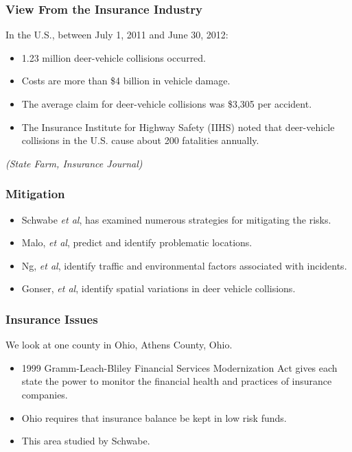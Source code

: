 \documentclass{beamer}   %
\begin{document}
\begin{frame}
  \frametitle{View From the Insurance Industry}
  In the U.S., between July 1, 2011 and June 30, 2012:
  \begin{itemize}
  \item 1.23 million deer-vehicle collisions occurred.
  \item Costs are more than \$4 billion in vehicle damage.
  \item The average claim for deer-vehicle collisions was
    \$3,305 per accident.
  \item The Insurance Institute for Highway Safety (IIHS) noted
    that deer-vehicle collisions in the U.S. cause about 200
    fatalities annually.
  \end{itemize}
  \emph{(State Farm, Insurance Journal)}
\end{frame}

\begin{frame}
  \frametitle{Mitigation}
  
  \begin{itemize}
  \item Schwabe \textit{et al}, has examined numerous strategies
    for mitigating the risks.
  \item Malo, \textit{et al}, predict and identify
    problematic locations.
  \item Ng, \textit{et al}, identify traffic and environmental factors
    associated with incidents.
  \item Gonser, \textit{et al}, identify spatial variations in deer
    vehicle collisions.
  \end{itemize}

\end{frame}

\begin{frame}
  \frametitle{Insurance Issues}
  We look at one county in Ohio, Athens County, Ohio.
  \begin{itemize}
  \item 1999 Gramm-Leach-Bliley Financial Services Modernization Act
    gives each state the power to monitor the financial health and
    practices of insurance companies.
  \item Ohio requires that insurance balance be kept in low risk
    funds.
  \item This area studied by Schwabe.
  \end{itemize}
\end{frame}
\end{document}
